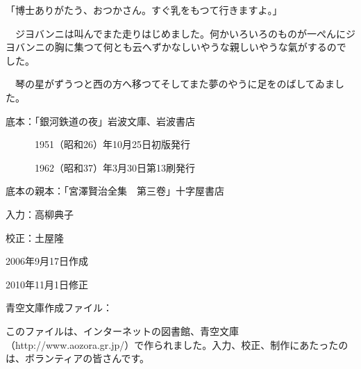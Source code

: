 \documentclass[tate,paper=b6j,jafontsize=9pt]{jlreq}
\begin{document}
「博士ありがたう、おつかさん。すぐ乳をもつて行きますよ。」

　ジヨバンニは叫んでまた走りはじめました。何かいろいろのものが一ぺんにジヨバンニの胸に集つて何とも云へずかなしいやうな親しいやうな氣がするのでした。


　琴の星がずうつと西の方へ移つてそしてまた夢のやうに足をのばしてゐました。




\newpage
底本：「銀河鉄道の夜」岩波文庫、岩波書店

　　　1951（昭和26）年10月25日初版発行

　　　1962（昭和37）年3月30日第13刷発行

底本の親本：「宮澤賢治全集　第三卷」十字屋書店

入力：高柳典子

校正：土屋隆

2006年9月17日作成

2010年11月1日修正

青空文庫作成ファイル：

このファイルは、インターネットの図書館、青空文庫（http://www.aozora.gr.jp/）で作られました。入力、校正、制作にあたったのは、ボランティアの皆さんです。
\end{document}
